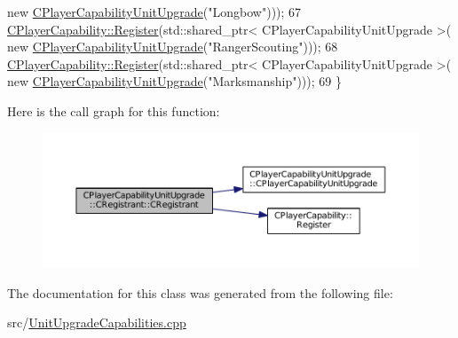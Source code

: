 \begin{DoxyCode}
{      new} \hyperlink{classCPlayerCapabilityUnitUpgrade_ac87129322f9f31cc271ee3de33502c56}{CPlayerCapabilityUnitUpgrade}(\textcolor{stringliteral}{"Longbow"})));
67     \hyperlink{classCPlayerCapability_a7e298018dcde2684451add3cfff065f7}{CPlayerCapability::Register}(std::shared\_ptr< CPlayerCapabilityUnitUpgrade >(\textcolor{keyword}{
      new} \hyperlink{classCPlayerCapabilityUnitUpgrade_ac87129322f9f31cc271ee3de33502c56}{CPlayerCapabilityUnitUpgrade}(\textcolor{stringliteral}{"RangerScouting"})));
68     \hyperlink{classCPlayerCapability_a7e298018dcde2684451add3cfff065f7}{CPlayerCapability::Register}(std::shared\_ptr< CPlayerCapabilityUnitUpgrade >(\textcolor{keyword}{
      new} \hyperlink{classCPlayerCapabilityUnitUpgrade_ac87129322f9f31cc271ee3de33502c56}{CPlayerCapabilityUnitUpgrade}(\textcolor{stringliteral}{"Marksmanship"})));
69 \}
\end{DoxyCode}
Here is the call graph for this function\+:\nopagebreak
\begin{figure}[H]
\begin{center}
\leavevmode
\includegraphics[width=350pt]{classCPlayerCapabilityUnitUpgrade_1_1CRegistrant_a8f2e3658c14746284f855fadb0bfa84d_cgraph}
\end{center}
\end{figure}


The documentation for this class was generated from the following file\+:\begin{DoxyCompactItemize}
\item 
src/\hyperlink{UnitUpgradeCapabilities_8cpp}{Unit\+Upgrade\+Capabilities.\+cpp}\end{DoxyCompactItemize}
